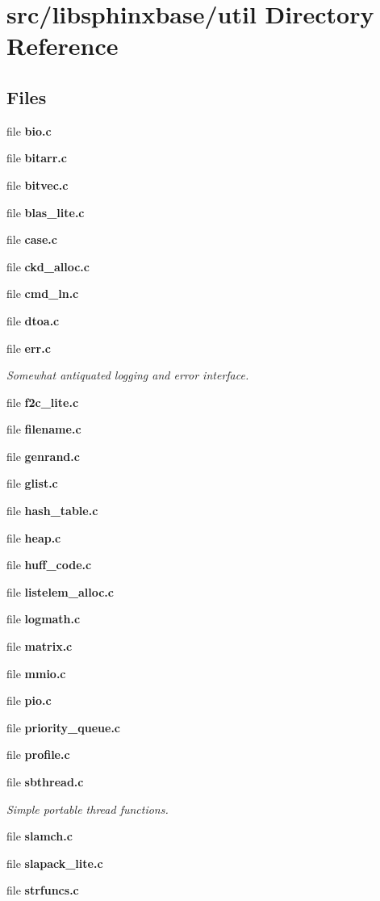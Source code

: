 \section{src/libsphinxbase/util Directory Reference}
\label{dir_dc1f04dceb148346198172cb52290701}
\subsection*{Files}
\begin{DoxyCompactItemize}
\item 
file {\bfseries bio.\+c}
\item 
file {\bfseries bitarr.\+c}
\item 
file {\bfseries bitvec.\+c}
\item 
file {\bfseries blas\+\_\+lite.\+c}
\item 
file {\bfseries case.\+c}
\item 
file {\bfseries ckd\+\_\+alloc.\+c}
\item 
file {\bfseries cmd\+\_\+ln.\+c}
\item 
file {\bfseries dtoa.\+c}
\item 
file {\bf err.\+c}
\begin{DoxyCompactList}\small\item\em Somewhat antiquated logging and error interface. \end{DoxyCompactList}\item 
file {\bfseries f2c\+\_\+lite.\+c}
\item 
file {\bfseries filename.\+c}
\item 
file {\bfseries genrand.\+c}
\item 
file {\bfseries glist.\+c}
\item 
file {\bfseries hash\+\_\+table.\+c}
\item 
file {\bfseries heap.\+c}
\item 
file {\bfseries huff\+\_\+code.\+c}
\item 
file {\bfseries listelem\+\_\+alloc.\+c}
\item 
file {\bfseries logmath.\+c}
\item 
file {\bfseries matrix.\+c}
\item 
file {\bfseries mmio.\+c}
\item 
file {\bfseries pio.\+c}
\item 
file {\bfseries priority\+\_\+queue.\+c}
\item 
file {\bfseries profile.\+c}
\item 
file {\bf sbthread.\+c}
\begin{DoxyCompactList}\small\item\em Simple portable thread functions. \end{DoxyCompactList}\item 
file {\bfseries slamch.\+c}
\item 
file {\bfseries slapack\+\_\+lite.\+c}
\item 
file {\bfseries strfuncs.\+c}
\end{DoxyCompactItemize}
